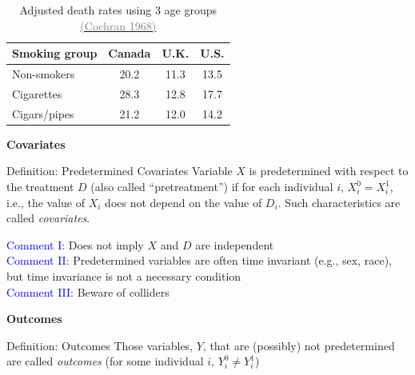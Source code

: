 \documentclass[notes=show]{beamer}
\newcommand{\myurlshort}[2]{\href{#1}{\textcolor{gray}{\textsf{#2}}}}
\begin{document}
\begin{frame}[plain]

	\begin{table}\centering
	\caption{Adjusted death rates using 3 age groups \myurlshort{http://psycnet.apa.org/psycinfo/1968-16440-001}{(Cochran 1968)}}
		\begin{center}
		\begin{tabular}{lccc}
		\hline \hline
		\multicolumn{1}{l}{Smoking group}&
		\multicolumn{1}{c}{Canada}&
		\multicolumn{1}{c}{U.K.}&
		\multicolumn{1}{c}{U.S.}\\
		\hline
		Non-smokers & 20.2 & 11.3 & 13.5 \\
		Cigarettes & 28.3 & 12.8  &  17.7 \\
		Cigars/pipes & 21.2 & 12.0 & 14.2 \\
		\hline
		\end{tabular}
		\end{center}
	\end{table}

\end{frame}

\begin{frame}[plain]
	\begin{center}
	\textbf{Covariates}
	\end{center}
	
	\begin{block}{Definition: Predetermined Covariates}
	Variable $X$ is predetermined with respect to the treatment $D$ (also called ``pretreatment'') if for each individual $i$, $X^0_i = X^1_i$, i.e., the value of $X_i$ does not depend on the value of $D_i$.  Such characteristics are called \emph{covariates}.
	\end{block}
	
	 \textcolor{blue}{Comment I}: Does not imply $X$ and $D$ are independent \\
	 \textcolor{blue}{Comment II}: Predetermined variables are often time invariant (e.g., sex, race), but time invariance is not a necessary condition \\
	 \textcolor{blue}{Comment III}: Beware of colliders \\
	
\end{frame}

\begin{frame}[plain]

\begin{center}
\textbf{Outcomes}
\end{center}

	\begin{block}{Definition: Outcomes}
	Those variables, $Y$, that are (possibly) not predetermined are called \emph{outcomes} (for some individual $i$, $Y^0_i\neq Y^1_i$)
	\end{block}
	

\end{frame}
\end{document}
